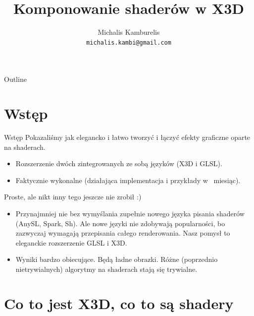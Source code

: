 \documentclass{beamer}
\title{Komponowanie shaderów w X3D}
\author[Michalis Kamburelis]{Michalis Kamburelis \\ \texttt{michalis.kambi@gmail.com}}
\begin{document}
{
  \begin{frame}
    \titlepage
  \end{frame}
}

\begin{frame}{Outline}
  \tableofcontents
\end{frame}

\section{Wstęp}

\begin{frame}{Wstęp}
Pokazaliśmy jak elegancko i łatwo tworzyć i łączyć efekty graficzne
oparte na shaderach.

\begin{itemize}
  \item Rozszerzenie dwóch zintegrowanych ze sobą języków (X3D i GLSL).
  \item Faktycznie wykonalne (działająca implementacja i przykłady w ~miesiąc).
\end{itemize}

Proste, ale nikt inny tego jeszcze nie zrobił :)

\begin{itemize}
  \item Przynajmniej nie bez wymyślania zupełnie nowego języka pisania shaderów
    (AnySL, Spark, Sh). Ale nowe języki nie zdobywają popularności,
    bo zazwyczaj wymagają przepisania całego renderowania.
    Nasz pomysł to eleganckie rozszerzenie GLSL  i X3D.
  \item Wyniki bardzo obiecujące. Będą ładne obrazki.
    Różne (poprzednio nietrywialnych) algorytmy na shaderach stają się
    trywialne.
\end{itemize}
\end{frame}

\section{Co to jest X3D, co to są shadery}
\end{document}
